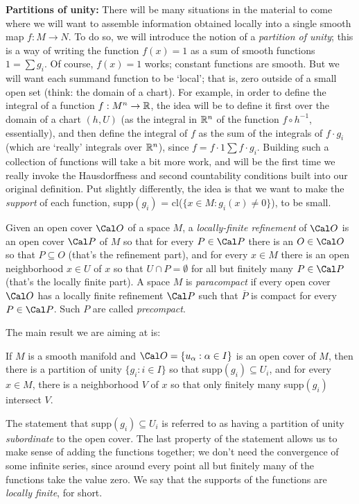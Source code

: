 \msk

{\bf Partitions of unity:} There will be many situations in the material to come where we will want to assemble information
obtained locally into a single smooth map $f:M\rightarrow N$. To do so, we will introduce the
notion of a {\it partition of unity}; this is a way of writing the function $f(x)=1$ as a sum
of smooth functions $1=\sum g_i$. Of course, $f(x)=1$ works; constant functions are smooth. 
But we will want each
summand function to be `local'; that is, zero outside of a small open set (think: the domain of a chart).
For example, in order to define the integral of a function $f:M^n\rightarrow {\Bbb R}$, the idea will be to 
define it first over the domain of a chart $(h,U)$ (as the integral in ${\Bbb R}^n$ of the function
$f\circ h^{-1}$, essentially), and then define the integral of $f$ as the sum of the integrals
of $f\cdot g_i$ (which are `really' integrals over ${\Bbb R}^n$), since $f = f\cdot 1 \sum f\cdot g_i$.
Building such a collection of functions will take a bit more work, and will be the first time we 
really invoke the Hausdorffness and
second countability conditions built into our original definition. 
Put slightly differently, the idea is that 
we want to make the
{\it support} of each function, supp$(g_i)$ = cl($\{x\in M : g_i(x)\neq 0\}$), to be small.


Given an open cover ${\Cal O}$ of a space $M$, a {\it locally-finite refinement} of ${\Cal O}$
is an open cover ${\Cal P}$ of $M$ so that for every $P\in{\Cal P}$ there is an $O\in{\Cal O}$
so that $P\subseteq O$ (that's the refinement part), and for every $x\in M$ there
is an open neighborhood $x\in U$ of $x$ so that $U\cap P=\emptyset$ for all but finitely many
$P\in {\Cal P}$ (that's the locally finite part). A space $M$ is {\it paracompact} if 
every open cover ${\Cal O}$ has a locally finite refinement ${\Cal P}$ such that $\overline{P}$ is compact
for every $P\in {\Cal P}$. Such $P$ are called {\it precompact}.

The main result we are aiming at is:

\ssk

If $M$ is a smooth manifold and ${\Cal O}=\{u_\alpha : \alpha\in I\}$ is an open cover of $M$, then there
is a partition of unity $\{g_i : i\in I\}$ so that supp$(g_i)\subseteq U_i$, and for every $x\in M$,
there is a neighborhood $V$ of $x$ so that only finitely many supp$(g_i)$ intersect $V$.

\ssk

The statement that supp$(g_i)\subseteq U_i$ is referred to as having a partition of unity
{\it subordinate} to the open cover.
The last property of the statement allows us to make sense of adding the functions together; we don't
need the convergence of some infinite series, since around every point all but finitely many of the
functions take the value zero. We say that the supports of the functions are {\it locally finite},
for short.

